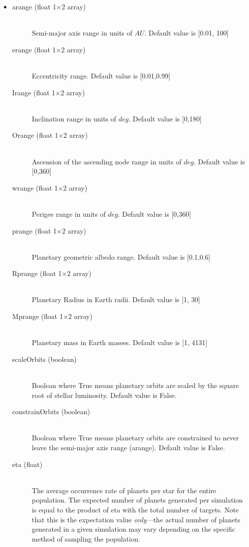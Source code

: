 \documentclass[cleanfoot]{asme2ej}
\begin{document}
\begin{itemize}
\item
\begin{description}
    \item[arange (float 1$\times$2 array)] \hfill \\ Semi-major axis range in units of $ AU $. Default value is [0.01, 100]
    \item[erange (float 1$\times$2 array)] \hfill \\ Eccentricity range.  Default value is [0.01,0.99]
    \item[Irange (float 1$\times$2 array)] \hfill \\ Inclination range in units of $ deg $.  Default value is [0,180]
    \item[Orange (float 1$\times$2 array)] \hfill \\ Ascension of the ascending node range in units of $ deg $.  Default value is [0,360]
    \item[wrange (float 1$\times$2 array)] \hfill \\ Perigee range in units of $ deg $.  Default value is [0,360]
    \item[prange (float 1$\times$2 array)] \hfill \\ Planetary geometric albedo range.  Default value is [0.1,0.6]
    \item[Rprange (float 1$\times$2 array)] \hfill \\ Planetary Radius in Earth radii.  Default value is [1, 30]
    \item[Mprange (float 1$\times$2 array)] \hfill \\ Planetary mass in Earth masses.  Default value is [1, 4131]
    \item [scaleOrbits (boolean)] \hfill \\ Boolean where True means planetary orbits are scaled by the square root of stellar luminosity. Default value is False.
    \item[constrainOrbits (boolean)] \hfill \\ Boolean where True means planetary orbits are constrained to never leave the semi-major axis range (arange). Default value is False.
    \item[eta (float)] \hfill \\ The average occurrence rate of planets per star for the entire population.  The expected number of planets generated per simulation is equal to the product of eta with the total number of targets.  Note that this is the expectation value \emph{only}---the actual number of planets generated in a given simulation may vary depending on the specific method of sampling the population.
\end{description}
\end{itemize}
\end{document}
